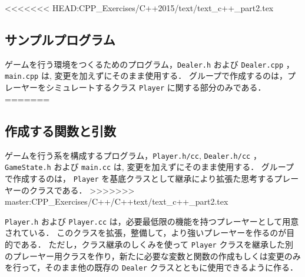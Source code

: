 <<<<<<< HEAD:CPP_Exercises/C++2015/text/text_c++_part2.tex
\subsection*{サンプルプログラム}
ゲームを行う環境をつくるためのプログラム，\verb+Dealer.h+ および \verb+Dealer.cpp+ ，\verb+main.cpp+ は, 変更を加えずにそのまま使用する．
グループで作成するのは，プレーヤーをシミュレートするクラス \verb+Player+ に関する部分のみである．
=======
\subsection{作成する関数と引数}

ゲームを行う系を構成するプログラム，\verb+Player.h/cc+, \verb+Dealer.h/cc+ ，\verb+GameState.h+ および \verb+main.cc+ は, 変更を加えずにそのまま使用する．
グループで作成するのは，
\verb+Player+ を基底クラスとして継承により拡張た思考するプレーヤーのクラスである．
>>>>>>> master:CPP_Exercises/C++/C++text/text_c++_part2.tex

\verb+Player.h+ および \verb+Player.cc+ は，必要最低限の機能を持つプレーヤーとして用意されている．
このクラスを拡張，整備して，より強いプレーヤーを作るのが目的である．
ただし，クラス継承のしくみを使って \verb+Player+ クラスを継承した別のプレーヤー用クラスを作り，新たに必要な変数と関数の作成もしくは変更のみを行って，そのまま他の既存の \verb+Dealer+ クラスとともに使用できるように作る．

